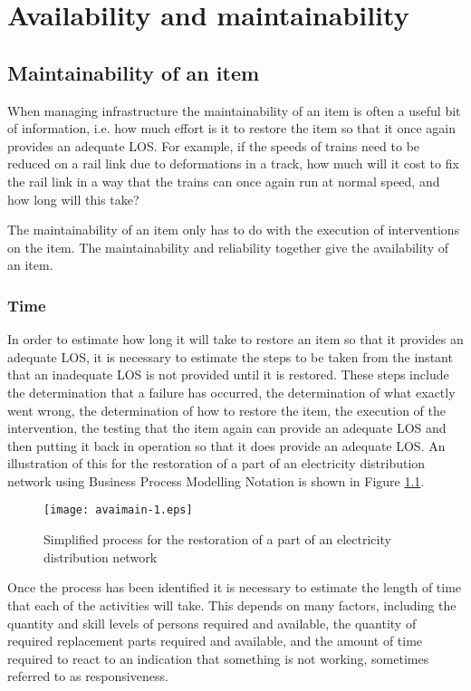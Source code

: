 %
%
%
\chapter{Availability and maintainability}
\label{avaimain} %
\section{Maintainability of an item}
When managing infrastructure the maintainability of an item is often a useful
bit of information, i.e. how much effort is it to restore the item so that it
once again provides an adequate LOS. For example, if the speeds of trains need to
be reduced on a rail link due to deformations in a track, how much will it cost
to fix the rail link in a way that the trains can once again run at normal speed,
and how long will this take?

The maintainability of an item only has to do with the execution of
interventions on the item. The maintainability and reliability together give the
availability of an item.

\subsection{Time}
In order to estimate how long it will take to restore an item so that it
provides an adequate LOS, it is necessary to estimate the steps to be taken from
the instant that an inadequate LOS is not provided until it is restored. These
steps include the determination that a failure has occurred, the determination of
what exactly went wrong, the determination of how to restore the item, the
execution of the intervention, the testing that the item again can provide an
adequate LOS and then putting it back in operation so that it does provide an
adequate LOS. An illustration of this for the restoration of a part of an
electricity distribution network using Business Process Modelling Notation is
shown in Figure \ref{avaimain:1}.

\begin{figure}[h]
\texttt{[image: avaimain-1.eps]}
\caption{Simplified process for the restoration of a part of an electricity
distribution network}\label{avaimain:1}
\end{figure}
Once the process has been identified it is necessary to estimate the length of
time that each of the activities will take. This depends on many factors,
including the quantity and skill levels of persons required and available, the
quantity of required replacement parts required and available, and the amount of
time required to react to an indication that something is not working, sometimes
referred to as responsiveness.
